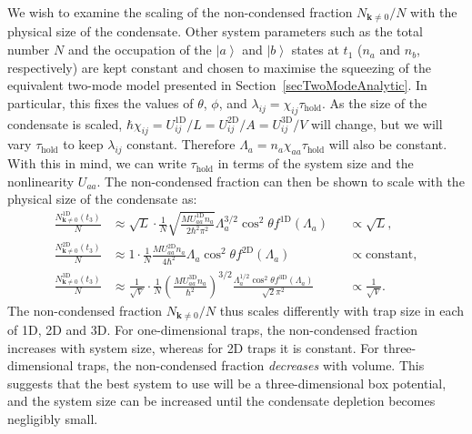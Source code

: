 \documentclass{iopart}
\newcommand{\ket}[1]{\ensuremath{\left|#1\right>}}
\begin{document}
We wish to examine the scaling of the non-condensed fraction $N_{\mathbf{k}\neq0}/N$ with the physical size of the condensate.  Other system parameters such as the total number $N$ and the occupation of the $\ket{a}$ and $\ket{b}$ states at $t_1$ ($n_a$ and $n_b$, respectively) are kept constant and chosen to maximise the squeezing of the equivalent two-mode model presented in Section~\ref{secTwoModeAnalytic}.  In particular, this fixes the values of $\theta$, $\phi$, and $\lambda_{ij} = \chi_{ij}\tau_\text{hold}$.  As the size of the condensate is scaled, $\hbar \chi_{ij} = U^\text{1D}_{ij}/L = U^\text{2D}_{ij}/A = U^\text{3D}_{ij}/V$ will change, but we will vary $\tau_\text{hold}$ to keep $\lambda_{ij}$ constant.  Therefore $\Lambda_a = n_a\chi_{aa}\tau_\text{hold}$ will also be constant.  With this in mind, we can write $\tau_\text{hold}$ in terms of the system size and the nonlinearity $U_{aa}$.  The non-condensed fraction can then be shown to scale with the physical size of the condensate as:
\begin{align}
  \frac{N^\text{1D}_{\mathbf{k}\neq 0}(t_3)}{N} &\approx \sqrt{L} \cdot \frac{1}{N} \sqrt{\frac{M U^\text{1D}_{aa} n_a}{2 \hbar^2 \pi^2}} \Lambda_a^{3/2} \cos^2\theta f^\text{1D}(\Lambda_a) &&\propto \sqrt{L}, \\
  \frac{N^\text{2D}_{\mathbf{k}\neq 0}(t_3)}{N} &\approx 1 \cdot \frac{1}{N} \frac{M U^\text{2D}_{aa} n_a }{4 \hbar^2} \Lambda_a \cos^2\theta f^\text{2D}(\Lambda_a) &&\propto \text{constant}, \\
  \frac{N^\text{3D}_{\mathbf{k}\neq 0}(t_3)}{N} &\approx \frac{1}{\sqrt{V}} \cdot \frac{1}{N} \left(\frac{M U^\text{3D}_{aa} n_a}{\hbar^2}\right)^{3/2} \frac{\Lambda_a^{1/2} \cos^2\theta f^\text{3D}(\Lambda_a)}{\sqrt{2} \pi^2} &&\propto \frac{1}{\sqrt{V}}.
\end{align}
The non-condensed fraction $N_{\mathbf{k}\neq 0}/N$ thus scales differently with trap size in each of 1D, 2D and 3D.  For one-dimensional traps, the non-condensed fraction increases with system size, whereas for 2D traps it is constant.  For three-dimensional traps, the non-condensed fraction \emph{decreases} with volume.  This suggests that the best system to use will be a three-dimensional box potential, and the system size can be increased until the condensate depletion becomes negligibly small.
\end{document}
